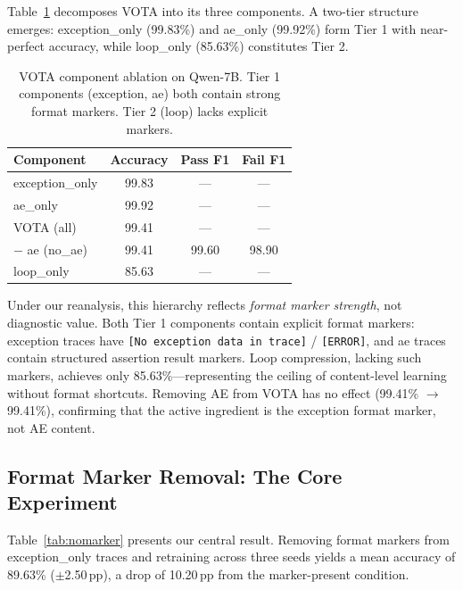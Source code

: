 \documentclass[11pt,a4paper]{article}
\newcommand{\pp}{\,\text{pp}}
\begin{document}
Table~\ref{tab:ablation} decomposes VOTA into its three components.
A two-tier structure emerges: exception\_only (99.83\%) and ae\_only (99.92\%) form Tier 1 with near-perfect accuracy, while loop\_only (85.63\%) constitutes Tier 2.

\begin{table}[t]
\centering
\small
\begin{tabular}{lccc}
\toprule
\textbf{Component} & \textbf{Accuracy} & \textbf{Pass F1} & \textbf{Fail F1} \\
\midrule
exception\_only & 99.83 & --- & --- \\
ae\_only & 99.92 & --- & --- \\
VOTA (all) & 99.41 & --- & --- \\
\quad $-$ ae (no\_ae) & 99.41 & 99.60 & 98.90 \\
loop\_only & 85.63 & --- & --- \\
\bottomrule
\end{tabular}
\caption{VOTA component ablation on Qwen-7B. Tier 1 components (exception, ae) both contain strong format markers. Tier 2 (loop) lacks explicit markers.}
\label{tab:ablation}
\end{table}

Under our reanalysis, this hierarchy reflects \emph{format marker strength}, not diagnostic value.
Both Tier 1 components contain explicit format markers: exception traces have \texttt{[No exception data in trace]} / \texttt{[ERROR]}, and ae traces contain structured assertion result markers.
Loop compression, lacking such markers, achieves only 85.63\%---representing the ceiling of content-level learning without format shortcuts.
Removing AE from VOTA has no effect (99.41\% $\to$ 99.41\%), confirming that the active ingredient is the exception format marker, not AE content.

\subsection{Format Marker Removal: The Core Experiment}
\label{sec:marker-removal}

Table~\ref{tab:nomarker} presents our central result.
Removing format markers from exception\_only traces and retraining across three seeds yields a mean accuracy of 89.63\% ($\pm$2.50$\pp$), a drop of 10.20$\pp$ from the marker-present condition.
\end{document}
